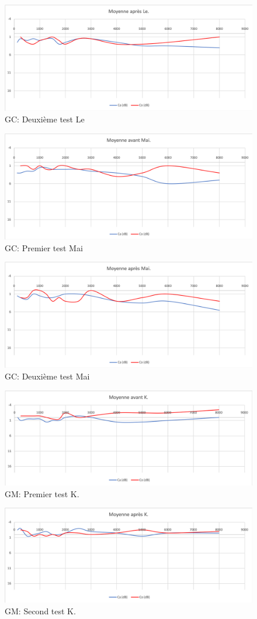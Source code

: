 \begin{figure}[th]
	\centering
	\includegraphics[width=0.7\linewidth]{images/graphiques/moyaprLE.png}
	\caption[GC: Patient Le : 2° test]{GC: Deuxième test Le}
	\label{fig:moyaprle}
\end{figure}


\begin{figure}[th]
	\centering
	\includegraphics[width=0.7\linewidth]{images/graphiques/moyavMAI}
	\caption[GC: Patient Mai : 1° test]{GC: Premier test Mai}
	\label{fig:moyavmai}
\end{figure}

\begin{figure}[th]
	\centering
	\includegraphics[width=0.7\linewidth]{images/graphiques/moyaprMAI}
	\caption[GC: Patient Mai: 2° test]{GC: Deuxième test Mai}
	\label{fig:moyaprmai}
\end{figure}
 \begin{figure}[th]
	\centering
	\includegraphics[width=0.7\linewidth]{images/graphiques/kad_pre.png}
	\caption[GM: Patient K. . 1° test]{GM: Premier test K.}
	
	
\end{figure}


\begin{figure}[th]
	\centering
	\includegraphics[width=0.7\linewidth]{images/graphiques/kad_post.png}
	\caption[GM: Patient K. : 2° test]{GM: Second test K.}
	
\end{figure}
